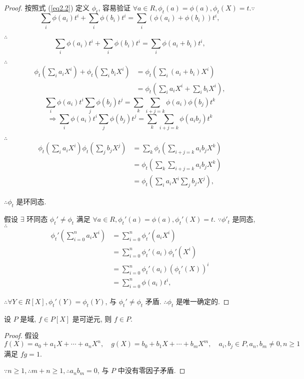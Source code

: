 \documentclass[UTF8]{ctexart}
\begin{document}
\begin{proof}
    按照式 (\ref{eq2.2}) 定义 $\phi_t$, 容易验证 $\forall a\in R,\phi_t(a)=\phi(a),\phi_t(X)=t.\because$
    \[\sum\limits_i\phi(a_i)t^i+\sum\limits_i\phi(b_i)t^i=\sum\limits_i(\phi(a_i)+\phi(b_i))t^i,\]
    
    $\therefore$
    \[\sum\limits_i\phi(a_i)t^i+\sum\limits_i\phi(b_i)t^i=\sum\limits_i\phi(a_i+b_i)t^i,\]
    
    $\therefore$
    \begin{align*}
        \phi_t\left(\sum\limits_ia_iX^i\right)+\phi_t\left(\sum\limits_ib_iX^i\right) & =\phi_t\left(\sum\limits_i(a_i+b_i)X^i\right) \\
        & =\phi_t\left(\sum\limits_ia_iX^i+\sum\limits_ib_iX^i\right),
    \end{align*}
    \[\sum\limits_i\phi(a_i)t^i\sum\limits_j\phi(b_j)t^j=\sum\limits_k\sum\limits_{i+j=k}\phi(a_i)\phi(b_j)t^k\]
    \[\Rightarrow\sum\limits_i\phi(a_i)t^i\sum\limits_j\phi(b_j)t^j=\sum\limits_k\sum\limits_{i+j=k}\phi(a_ib_j)t^k\]
    
    $\therefore$
    \begin{align*}
        \phi_t\left(\sum\limits_ia_iX^i\right)\phi_t\left(\sum\limits_jb_jX^j\right) & =\sum\limits_k\phi_t\left(\sum\limits_{i+j=k}a_ib_jX^k\right) \\
        & =\phi_t\left(\sum\limits_k\sum\limits_{i+j=k}a_ib_jX^k\right) \\
        & =\phi_t\left(\sum\limits_ia_iX^i\sum\limits_jb_jX^j\right),
    \end{align*}

    $\therefore\phi_t$ 是环同态.

    假设 $\exists$ 环同态 $\phi_t'\neq\phi_t$ 满足 $\forall a\in R,\phi_t'(a)=\phi(a),\phi_t'(X)=t$. $\because\phi'_t$ 是同态, $\therefore$
    \begin{align*}
        \phi_t'\left(\sum\limits_{i=0}^{n}a_iX^i\right) & =\sum\limits_{i=0}^{n}\phi_t'\left(a_iX^i\right) \\
        & =\sum\limits_{i=0}^{n}\phi_t'(a_i)\phi_t'\left(X^i\right) \\
        & =\sum\limits_{i=0}^{n}\phi_t'(a_i)(\phi_t'(X))^i \\
        & =\sum\limits_{i=0}^{n}\phi(a_i)t^i,
    \end{align*}

    $\therefore\forall Y\in R[X],\phi_t'(Y)=\phi_t(Y)$, 与 $\phi_t'\neq\phi_t$ 矛盾. $\therefore\phi_t$ 是唯一确定的.
\end{proof}
\begin{theorem}
    设 $P$ 是域, $f\in P[X]$ 是可逆元, 则 $f\in P$.
\end{theorem}
\begin{proof}
    假设
    \[f(X)=a_0+a_1X+\cdots+a_nX^n,\quad g(X)=b_0+b_1X+\cdots+b_mX^m,\quad a_i,b_j\in P,a_n,b_m\neq0,n\geq1\]
    满足 $fg=1$.

    $\because n\geq1,\therefore m+n\geq1,\therefore a_nb_m=0$, 与 $P$ 中没有零因子矛盾.
\end{proof}
\end{document}
